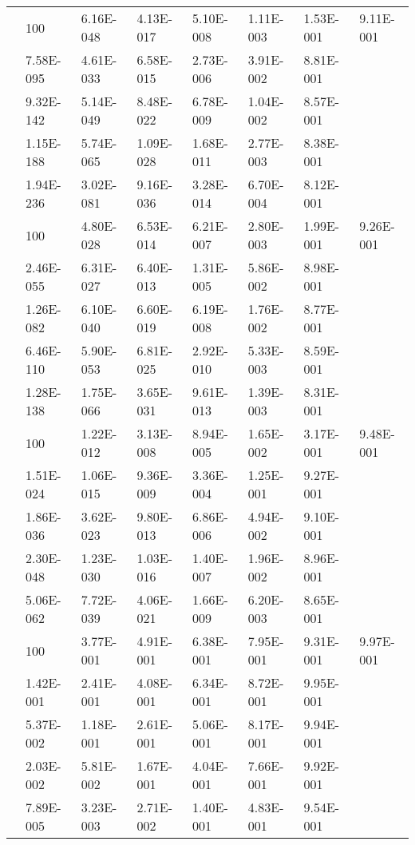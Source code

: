 \begin{table}[t]
\begin{tabular}{|c||l||l|l|l|l|l|l|}
  
    \hhline{|=#=#=|=|=|=|=|=|}
    \multicolumn{1}{|c||}{\multirow{5}{*}{$0.8$}}&
    100 & 6.16E-048 & 4.13E-017 & 5.10E-008 & 1.11E-003 & 1.53E-001 & 9.11E-001 \\ \EndRow
    200 & 7.58E-095 & 4.61E-033 & 6.58E-015 & 2.73E-006 & 3.91E-002 & 8.81E-001 \\ \EndRow
    300 & 9.32E-142 & 5.14E-049 & 8.48E-022 & 6.78E-009 & 1.04E-002 & 8.57E-001 \\ \EndRow
    400 & 1.15E-188 & 5.74E-065 & 1.09E-028 & 1.68E-011 & 2.77E-003 & 8.38E-001 \\ \EndRow
    500 & 1.94E-236 & 3.02E-081 & 9.16E-036 & 3.28E-014 & 6.70E-004 & 8.12E-001 \\ 

 
    \hhline{|=#=#=|=|=|=|=|=|}
    \multicolumn{1}{|c||}{\multirow{5}{*}{$0.5$}}&
    100 & 4.80E-028 & 6.53E-014 & 6.21E-007 & 2.80E-003 & 1.99E-001 & 9.26E-001 \\ \EndRow
    200 & 2.46E-055 & 6.31E-027 & 6.40E-013 & 1.31E-005 & 5.86E-002 & 8.98E-001 \\ \EndRow
    300 & 1.26E-082 & 6.10E-040 & 6.60E-019 & 6.19E-008 & 1.76E-002 & 8.77E-001 \\ \EndRow
    400 & 6.46E-110 & 5.90E-053 & 6.81E-025 & 2.92E-010 & 5.33E-003 & 8.59E-001 \\ \EndRow
    500 & 1.28E-138 & 1.75E-066 & 3.65E-031 & 9.61E-013 & 1.39E-003 & 8.31E-001 \\ 


    \hhline{|=#=#=|=|=|=|=|=|}
    \multicolumn{1}{|c||}{\multirow{5}{*}{$0.25$}}&
    100 & 1.22E-012 & 3.13E-008 & 8.94E-005 & 1.65E-002 & 3.17E-001 & 9.48E-001 \\ \EndRow
    200 & 1.51E-024 & 1.06E-015 & 9.36E-009 & 3.36E-004 & 1.25E-001 & 9.27E-001 \\ \EndRow
    300 & 1.86E-036 & 3.62E-023 & 9.80E-013 & 6.86E-006 & 4.94E-002 & 9.10E-001 \\ \EndRow
    400 & 2.30E-048 & 1.23E-030 & 1.03E-016 & 1.40E-007 & 1.96E-002 & 8.96E-001 \\ \EndRow
    500 & 5.06E-062 & 7.72E-039 & 4.06E-021 & 1.66E-009 & 6.20E-003 & 8.65E-001 \\ 

    
    \hhline{|=#=#=|=|=|=|=|=|}
    \multicolumn{1}{|c||}{\multirow{5}{*}{$0.01$}}&
    100 & 3.77E-001 & 4.91E-001 & 6.38E-001 & 7.95E-001 & 9.31E-001 & 9.97E-001 \\ \EndRow
    200 & 1.42E-001 & 2.41E-001 & 4.08E-001 & 6.34E-001 & 8.72E-001 & 9.95E-001 \\ \EndRow
    300 & 5.37E-002 & 1.18E-001 & 2.61E-001 & 5.06E-001 & 8.17E-001 & 9.94E-001 \\ \EndRow
    400 & 2.03E-002 & 5.81E-002 & 1.67E-001 & 4.04E-001 & 7.66E-001 & 9.92E-001 \\ \EndRow
    500 & 7.89E-005 & 3.23E-003 & 2.71E-002 & 1.40E-001 & 4.83E-001 & 9.54E-001 \\


\end{tabular}
\end{table}

